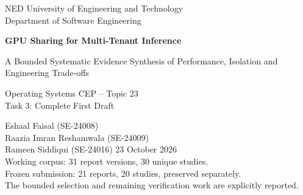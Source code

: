 \documentclass[12pt,a4paper]{article}
\begin{document}
\begin{titlepage}\centering
{\large NED University of Engineering and Technology\\Department of Software Engineering\par}\vspace{28mm}
{\LARGE\bfseries GPU Sharing for Multi-Tenant Inference\par}\vspace{6mm}
{\Large A Bounded Systematic Evidence Synthesis of Performance, Isolation and Engineering Trade-offs\par}\vspace{20mm}
{\large Operating Systems CEP -- Topic 23\\Task 3: Complete First Draft\par}\vspace{16mm}
Eshaal Faisal (SE-24008)\\Raazia Imran Reshamwala (SE-24009)\\Rameen Siddiqui (SE-24016)
\vfill 23 October 2026\\[6mm]
\small Working corpus: 31 report versions, 30 unique studies.\\Frozen submission: 21 reports, 20 studies, preserved separately.\\The bounded selection and remaining verification work are explicitly reported.
\end{titlepage}
\begin{abstract}
GPU sharing for multi-tenant inference requires a choice among resource efficiency, request latency, isolation and implementation cost. This working review synthesizes 30 studies represented by 31 reports. The imported search register contains 4,189 occurrences and 4,075 canonical records after 114 duplicate links. In the continued 559-record branch, title/abstract screening excluded 225 records and advanced 334; 10 additional studies met full-text eligibility, 4 reports were excluded at full text, and 320 advanced records await eligibility or identity closure. These branch counts do not constitute a reconciled final whole-review PRISMA flow. The analysis uses 300 appraisal items, 90 reported observations and two transparent calculations. It combines temporal scheduling, software spatial sharing, hardware partitions, runtime/API mediation, model-memory management and hybrid controls. The evidence supports conditional selection: fine-grained control can protect request latency, while model modification, profiling, transfer bandwidth and shared-context faults constrain its use. No pooled effect or universal winner is supported. The conclusions remain limited by incomplete selection, historical search-provenance gaps, title-only screening and source-version uncertainty.
\end{abstract}
\tableofcontents\clearpage

\clearpage
\clearpage
\end{document}
